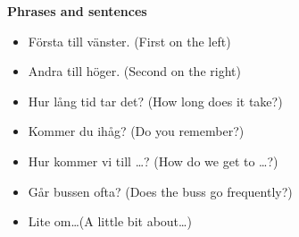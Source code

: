 
\begin{flushleft}
    \textbf{Phrases and sentences}
    \begin{itemize}
        \item Första till vänster. (First on the left)
        \item Andra till höger. (Second on the right)
        \item Hur lång tid tar det? (How long does it take?)
        \item Kommer du ihåg? (Do you remember?)
        \item Hur kommer vi till \ldots? (How do we get to \ldots?)
        \item Går bussen ofta? (Does the buss go frequently?)
        \item Lite om\ldots (A little bit about\ldots)
    \end{itemize}
\end{flushleft}

